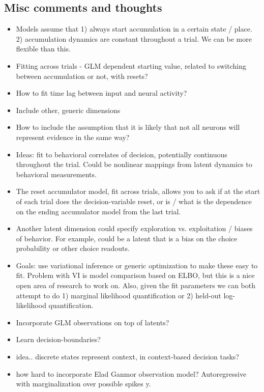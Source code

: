 \documentclass{article}
\begin{document}
\subsection{Misc comments and thoughts}
\begin{itemize}
\item Models assume that 1) always start accumulation in a certain state / place. 2) accumulation dynamics are constant throughout a trial. We can be more flexible than this. 
\item Fitting across trials - GLM dependent starting value, related to switching between accumulation or not, with resets?
\item How to fit time lag between input and neural activity? 
\item Include other, generic dimensions 
\item How to include the assumption that it is likely that not all neurons will represent evidence in the same way? 
\item Ideas: fit to behavioral correlates of decision, potentially continuous throughout the trial. Could be nonlinear mappings from latent dynamics to behavioral measurements. 
\item The reset accumulator model, fit across trials, allows you to ask if at the start of each trial does the decision-variable reset, or is / what is the dependence on the ending accumulator model from the last trial. 
\item Another latent dimension could specify exploration vs. exploitation / biases of behavior. For example, could be a latent that is a bias on the choice probability or other choice readouts. 
\item Goals: use variational inference or generic optimization to make these easy to fit. Problem with VI is model comparison based on ELBO, but this is a nice open area of research to work on. Also, given the fit parameters we can both attempt to do 1) marginal likelihood quantification or 2) held-out log-likelihood quantification. 
\item Incorporate GLM observations on top of latents? 
\item Learn decision-boundaries?
\item idea.. discrete states represent context, in context-based decision tasks? 
\item how hard to incorporate Elad Ganmor observation model? Autoregressive with marginalization over possible spikes y. 
\end{itemize}
\end{document}
